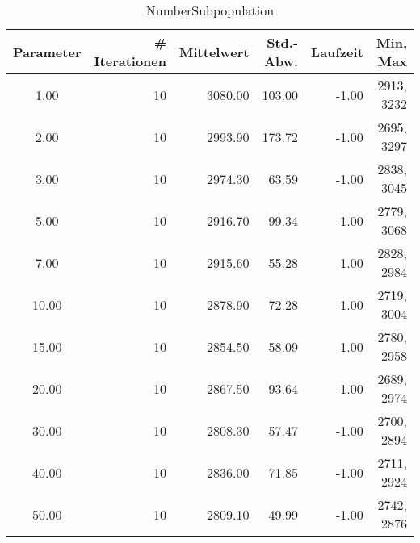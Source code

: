 \begin{table}[tbph]
\begin{tabular}{ | c || r | r | r | r | r | }
\hline
Parameter & \# Iterationen & Mittelwert & Std.-Abw. & Laufzeit & Min, Max \\
\hline
   1.00 &  10 & 3080.00 &  103.00 &   -1.00 & 2913, 3232 \\
   2.00 &  10 & 2993.90 &  173.72 &   -1.00 & 2695, 3297 \\
   3.00 &  10 & 2974.30 &   63.59 &   -1.00 & 2838, 3045 \\
   5.00 &  10 & 2916.70 &   99.34 &   -1.00 & 2779, 3068 \\
   7.00 &  10 & 2915.60 &   55.28 &   -1.00 & 2828, 2984 \\
  10.00 &  10 & 2878.90 &   72.28 &   -1.00 & 2719, 3004 \\
  15.00 &  10 & 2854.50 &   58.09 &   -1.00 & 2780, 2958 \\
  20.00 &  10 & 2867.50 &   93.64 &   -1.00 & 2689, 2974 \\
  30.00 &  10 & 2808.30 &   57.47 &   -1.00 & 2700, 2894 \\
  40.00 &  10 & 2836.00 &   71.85 &   -1.00 & 2711, 2924 \\
  50.00 &  10 & 2809.10 &   49.99 &   -1.00 & 2742, 2876 \\
\hline
\end{tabular}
\caption{NumberSubpopulation}\label{NumberSubpopulation}
\end{table}


